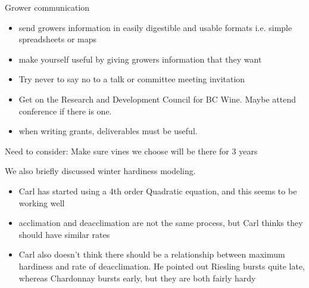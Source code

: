 \documentclass[11pt,letter]{article}
\newenvironment{smitemize}{
\begin{itemize}
  \setlength{\itemsep}{0pt}
  \setlength{\parskip}{0.8pt}
  \setlength{\parsep}{0pt}}
{\end{itemize}
}
\begin{document}
Grower communication
\begin{smitemize}
\item send growers information in easily digestible and usable formats i.e. simple spreadsheets or maps
\item make yourself useful by giving growers information that they want
\item Try never to say no to a talk or committee meeting invitation
\item Get on the Research and Development Council for BC Wine. Maybe attend conference if there is one.
\item when writing grants, deliverables must be useful.

\end{smitemize}

Need to consider: Make sure vines we choose will be there for 3 years
\vspace{1.5ex}

 We also briefly discussed winter hardiness modeling.
 \begin{smitemize}
\item Carl has started using a 4th order Quadratic equation, and this seems to be working well
\item acclimation and deacclimation are not the same process, but Carl thinks they should have similar rates
\item Carl also doesn't think there should be a relationship between maximum hardiness and rate of deacclimation. He pointed out Riesling bursts quite late, whereas Chardonnay bursts early, but they are both fairly hardy

\end{smitemize}
\end{document}
